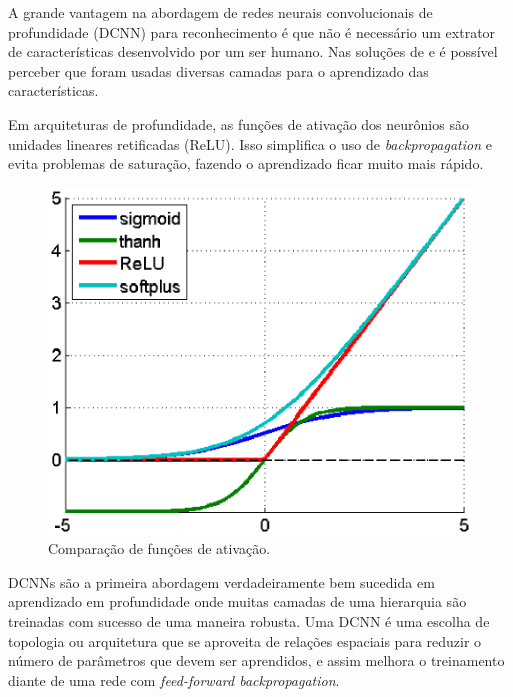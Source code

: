 A grande vantagem na abordagem de redes neurais convolucionais de
profundidade (DCNN) para reconhecimento é que não é necessário um
extrator de características desenvolvido por um ser humano. Nas
soluções de \cite{Krizhevsky} e \cite{Goodfellow} é possível perceber
que foram usadas diversas camadas para o aprendizado das
características.

Em arquiteturas de profundidade, as funções de ativação dos neurônios
são unidades lineares retificadas (ReLU). Isso simplifica o uso de
\textit{backpropagation} e evita problemas de saturação, fazendo o
aprendizado ficar muito mais rápido.

\begin{figure}[H]
\centering
\includegraphics[scale=0.6]{imagens/activation_funcs.eps}
\caption{Comparação de funções de ativação.}
\label{fig:activation_funcs}
\end{figure}

DCNNs são a primeira abordagem verdadeiramente bem sucedida em
aprendizado em profundidade onde muitas camadas de uma hierarquia são
treinadas com sucesso de uma maneira robusta. Uma DCNN é uma escolha
de topologia ou arquitetura que se aproveita de relações espaciais
para reduzir o número de parâmetros que devem ser aprendidos, e assim
melhora o treinamento diante de uma rede com \textit{feed-forward
  backpropagation}\cite{Arel2010}.
